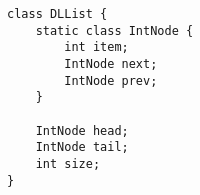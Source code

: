 \begin{lstlisting}
class DLList {
    static class IntNode {
        int item;
        IntNode next;
        IntNode prev;
    }

    IntNode head;
    IntNode tail;
    int size;
}
\end{lstlisting}